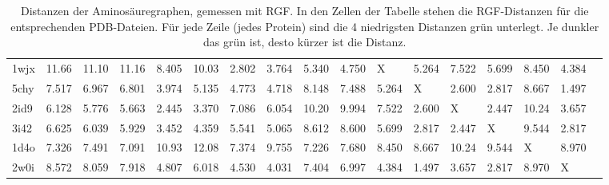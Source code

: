 \documentclass{report}
\begin{document}
\begin{table}[H]
{\begin{tabular}{l l l l l l l l l l l l l l l l l}
1wjx & 11.66 & 11.10 & 11.16 & 8.405 & 10.03 & \cellcolor{fGreen!100}2.802 & \cellcolor{fGreen!75}3.764 & 5.340 & \cellcolor{fGreen!25}4.750 &   X   & 5.264 & 7.522 & 5.699 & 8.450 & \cellcolor{fGreen!50}4.384 &  \\
5chy & 7.517 & 6.967 & 6.801 & \cellcolor{fGreen!25}3.974 & 5.135 & 4.773 & 4.718 & 8.148 & 7.488 & 5.264 &   X   & \cellcolor{fGreen!75}2.600 & \cellcolor{fGreen!50}2.817 & 8.667 & \cellcolor{fGreen!100}1.497 &  \\
2id9 & 6.128 & 5.776 & 5.663 & \cellcolor{fGreen!100}2.445 & \cellcolor{fGreen!25}3.370 & 7.086 & 6.054 & 10.20 & 9.994 & 7.522 & \cellcolor{fGreen!50}2.600 &   X   & \cellcolor{fGreen!75}2.447 & 10.24 & 3.657 &  \\
3i42 & 6.625 & 6.039 & 5.929 & \cellcolor{fGreen!25}3.452 & 4.359 & 5.541 & 5.065 & 8.612 & 8.600 & 5.699 & \cellcolor{fGreen!75}2.817 & \cellcolor{fGreen!100}2.447 &   X   & 9.544 & \cellcolor{fGreen!50}2.817 &  \\
1d4o & \cellcolor{fGreen!50}7.326 & 7.491 & \cellcolor{fGreen!100}7.091 & 10.93 & 12.08 & \cellcolor{fGreen!25}7.374 & 9.755 & \cellcolor{fGreen!75}7.226 & 7.680 & 8.450 & 8.667 & 10.24 & 9.544 &   X   & 8.970 &  \\
2w0i & 8.572 & 8.059 & 7.918 & 4.807 & 6.018 & 4.530 & \cellcolor{fGreen!25}4.031 & 7.404 & 6.997 & 4.384 & \cellcolor{fGreen!100}1.497 & \cellcolor{fGreen!50}3.657 & \cellcolor{fGreen!75}2.817 & 8.970 &   X   &  \\



\end{tabular}}
\caption{Distanzen der Aminos\"auregraphen, gemessen mit RGF. In den Zellen der Tabelle stehen die RGF-Distanzen f\"ur die entsprechenden PDB-Dateien. F\"ur jede Zeile (jedes Protein) sind die 4 niedrigsten Distanzen gr\"un unterlegt. Je dunkler das gr\"un ist, desto k\"urzer ist die Distanz.}
\label{table:occ-aag-rgf}
\end{table}
\end{document}
